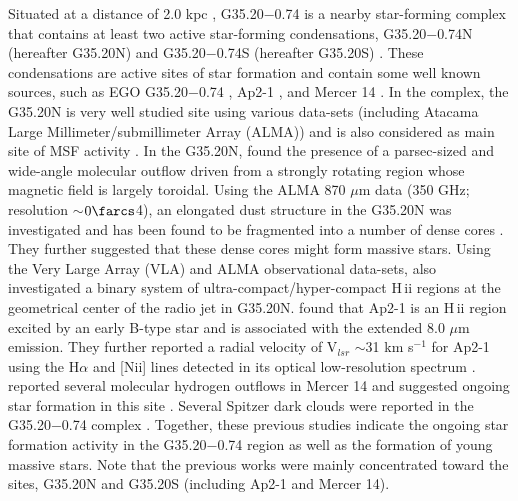 \documentclass[iop]{emulateapj}
\begin{document}
Situated at a distance of 2.0 kpc \citep{birks06,zhang09,paron10}, 
G35.20$-$0.74 \citep[V$_{lsr}$=33 km s$^{-1}$;][]{seta98,paron10} is a nearby star-forming complex 
that contains at least two active star-forming 
condensations, G35.20$-$0.74N (hereafter G35.20N) and G35.20$-$0.74S (hereafter G35.20S) 
\citep[also see Figure~4 in][]{mooney95}. 
These condensations are active sites of star formation and contain some well known sources, 
such as EGO G35.20$-$0.74 \citep{cyganowski08}, Ap2-1 \citep{paron10}, and Mercer 14 \citep{froebrich11}. 
In the complex, the G35.20N is very well studied site using various data-sets (including Atacama Large Millimeter/submillimeter Array (ALMA)) and is also considered as main site of MSF activity \citep[see][and references therein]{sanchez14}. In the G35.20N, \citet{qiu13} found the presence of a parsec-sized and wide-angle molecular outflow driven from a strongly rotating region 
whose magnetic field is largely toroidal. 
Using the ALMA 870 $\mu$m data (350 GHz; resolution $\sim$$0\farcs$4), an elongated dust structure in the G35.20N was investigated and 
has been found to be fragmented into a number of dense cores \citep{sanchez14}. They further suggested that these dense cores might form 
massive stars. Using the Very Large Array (VLA) and ALMA observational data-sets, \citet{beltran16} also investigated a binary system of 
ultra-compact/hyper-compact H\,{\sc ii} regions at the geometrical center of the radio jet in G35.20N. 
\citet{paron10} found that Ap2-1 is an H\,{\sc ii} region excited by an early B-type star and is associated with 
the extended 8.0 $\mu$m emission. They further reported a radial velocity of V$_{lsr}$ $\sim$31 km s$^{-1}$ for Ap2-1 using the H$\alpha$ and [N{\sc ii}] lines detected in its optical low-resolution spectrum \citep[see Figure~9 in][]{paron10}. \citet{froebrich11} reported several molecular hydrogen outflows in Mercer 14 and suggested 
ongoing star formation in this site \citep[see Figure~1 in][]{froebrich11}. 
Several Spitzer dark clouds were reported in the G35.20$-$0.74 complex \citep{peretto09}. 
Together, these previous studies indicate the ongoing star formation activity in the G35.20$-$0.74 region as well as 
the formation of young massive stars. Note that the previous works were mainly concentrated toward 
the sites, G35.20N and G35.20S (including Ap2-1 and Mercer 14). 
\end{document}
